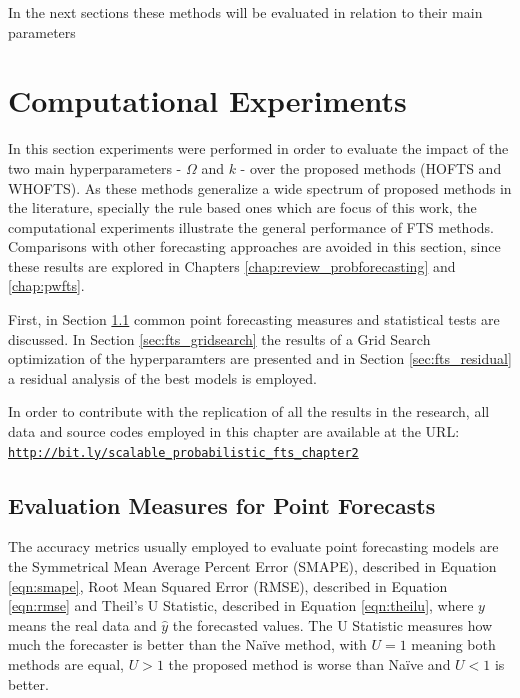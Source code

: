 In the next sections these methods will be evaluated in relation to their main parameters 

%
\section{Computational Experiments}
\label{sec:fts_experiments}

In this section experiments were performed  in order to evaluate the impact of the two main hyperparameters - $\Omega$ and $k$ - over the proposed methods (HOFTS and WHOFTS). As these methods generalize a wide spectrum of proposed methods in the literature, specially the rule based ones which are focus of this work, the computational experiments illustrate the general performance of FTS methods. Comparisons with other forecasting approaches are avoided in this section, since these results are explored in Chapters \ref{chap:review_probforecasting} and \ref{chap:pwfts}.

First, in Section \ref{sec:point_measures} common point forecasting measures and statistical tests are discussed. In Section \ref{sec:fts_gridsearch} the results of a Grid Search optimization of the hyperparamters are presented and in Section \ref{sec:fts_residual} a residual analysis of the best models is employed.

In order to contribute with the replication of all the results in the research, all data and source codes employed in this chapter are available at the URL:
\texttt{\url{http://bit.ly/scalable_probabilistic_fts_chapter2}}

%
\subsection{Evaluation Measures for Point Forecasts}
\label{sec:point_measures}


The accuracy metrics usually employed to evaluate point forecasting models are the Symmetrical Mean Average Percent Error (SMAPE), described in Equation \eqref{eqn:smape}, Root Mean Squared Error (RMSE), described in Equation \eqref{eqn:rmse} and Theil's U Statistic, described in Equation \eqref{eqn:theilu},  where $y$ means the real data and $\hat{y}$ the forecasted values. The U Statistic measures how much the forecaster is better than the Na\"{i}ve method, with $U = 1$ meaning both methods are equal, $U > 1$ the proposed method is worse than Na\"{i}ve and $U < 1$ is better.  

